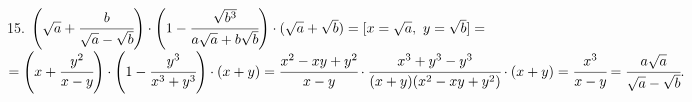 15. $\left(\sqrt{a}+\cfrac{b}{\sqrt{a}-\sqrt{b}}\right)\cdot\left(1-\cfrac{\sqrt{b^3}}{a\sqrt{a}+b\sqrt{b}}\right)\cdot
(\sqrt{a}+\sqrt{b})=[x=\sqrt{a},\ y=\sqrt{b}]=$\\$=\left(x+\cfrac{y^2}{x-y}\right)\cdot\left(1-\cfrac{y^3}{x^3+y^3}\right)\cdot(x+y)=
\cfrac{x^2-xy+y^2}{x-y}\cdot\cfrac{x^3+y^3-y^3}{(x+y)(x^2-xy+y^2)}\cdot(x+y)=\cfrac{x^3}{x-y}=\cfrac{a\sqrt{a}}{\sqrt{a}-\sqrt{b}}.$\\

